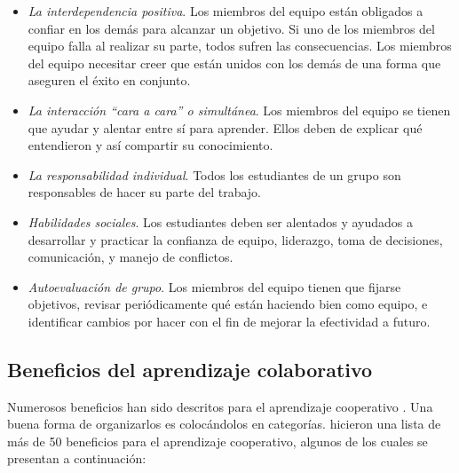 \begin{itemize}
  \item \emph{La interdependencia positiva}. Los miembros del equipo están obligados a confiar en los demás para alcanzar un objetivo. Si uno de los miembros del equipo falla al realizar su parte, todos sufren las consecuencias. Los miembros del equipo necesitar creer que están unidos con los demás de una forma que aseguren el éxito en conjunto.
  \item \emph{La interacción ``cara a cara'' o simultánea}. Los miembros del equipo se tienen que ayudar y alentar entre sí para aprender. Ellos deben de explicar qué entendieron y así compartir su conocimiento.
  \item \emph{La responsabilidad individual}. Todos los estudiantes de un grupo son responsables de hacer su parte del trabajo.
  \item \emph{Habilidades sociales}. Los estudiantes deben ser alentados y ayudados a desarrollar y practicar la confianza de equipo, liderazgo, toma de decisiones, comunicación, y manejo de conflictos.
  \item \emph{Autoevaluación de grupo}. Los miembros del equipo tienen que fijarse objetivos, revisar periódicamente qué están haciendo bien como equipo, e identificar cambios por hacer con el fin de mejorar la efectividad a futuro.
\end{itemize}
\subsection{Beneficios del aprendizaje colaborativo}
Numerosos beneficios han sido descritos para el aprendizaje cooperativo \cite{panitz_1999}. Una buena forma de organizarlos es colocándolos en categorías.  hicieron una lista de más de 50 beneficios para el aprendizaje cooperativo, algunos de los cuales se presentan a continuación:

